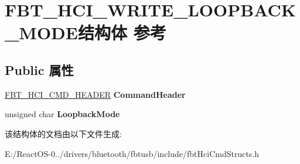 \hypertarget{struct_f_b_t___h_c_i___w_r_i_t_e___l_o_o_p_b_a_c_k___m_o_d_e}{}\section{F\+B\+T\+\_\+\+H\+C\+I\+\_\+\+W\+R\+I\+T\+E\+\_\+\+L\+O\+O\+P\+B\+A\+C\+K\+\_\+\+M\+O\+D\+E结构体 参考}
\label{struct_f_b_t___h_c_i___w_r_i_t_e___l_o_o_p_b_a_c_k___m_o_d_e}
\subsection*{Public 属性}
\begin{DoxyCompactItemize}
\item 
\mbox{\label{struct_f_b_t___h_c_i___w_r_i_t_e___l_o_o_p_b_a_c_k___m_o_d_e_a8aebdf14fad28c9241966f34e24a09c3}} 
\hyperlink{struct_f_b_t___h_c_i___c_m_d___h_e_a_d_e_r}{F\+B\+T\+\_\+\+H\+C\+I\+\_\+\+C\+M\+D\+\_\+\+H\+E\+A\+D\+ER} {\bfseries Command\+Header}
\item 
\mbox{\label{struct_f_b_t___h_c_i___w_r_i_t_e___l_o_o_p_b_a_c_k___m_o_d_e_a84117910b780530a30de8277a69c6243}} 
unsigned char {\bfseries Loopback\+Mode}
\end{DoxyCompactItemize}


该结构体的文档由以下文件生成\+:\begin{DoxyCompactItemize}
\item 
E\+:/\+React\+O\+S-\/0../drivers/bluetooth/fbtusb/include/fbt\+Hci\+Cmd\+Structs.\+h\end{DoxyCompactItemize}

